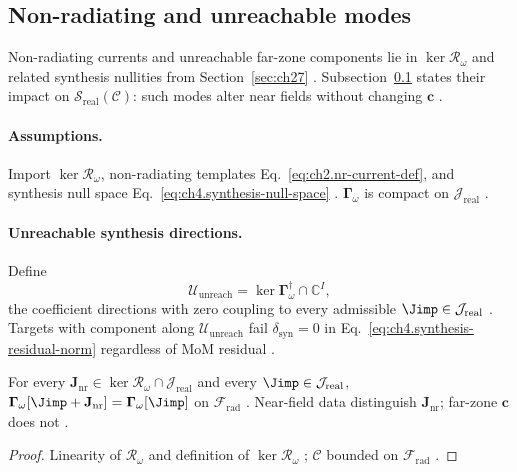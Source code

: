 \subsection{Non-radiating and unreachable modes}
\label{sec:ch471}

Non-radiating currents and unreachable far-zone components lie in \(\ker\mathcal{R}_\omega\) and related synthesis nullities
from Section~\ref{sec:ch27} \cite{stratton1941,harrington2001}. Subsection~\ref{sec:ch471} states their impact on
\(\mathcal{S}_{\mathrm{real}}(\mathcal{C})\): such modes alter near fields without changing \(\mathbf{c}\) \cite{devaney2004}.

\paragraph{Assumptions.}
Import \(\ker\mathcal{R}_\omega\), non-radiating templates Eq.~\eqref{eq:ch2.nr-current-def}, and synthesis null space
Eq.~\eqref{eq:ch4.synthesis-null-space} \cite{stratton1941,harrington2001}. \(\boldsymbol{\Gamma}_\omega\) is compact on
\(\mathcal{J}_{\mathrm{real}}\) \cite{harrington2001,devaney2004}.

\paragraph{Unreachable synthesis directions.}
Define
\begin{equation}
\label{eq:ch4.unreachable-modes}
\mathcal{U}_{\mathrm{unreach}}
=
\ker\boldsymbol{\Gamma}_\omega^{\dagger}
\cap
\mathbb{C}^{I},
\end{equation}
the coefficient directions with zero coupling to every admissible \(\Jimp\in\mathcal{J}_{\mathrm{real}}\)
\cite{stratton1941,harrington2001,devaney2004}. Targets with component along \(\mathcal{U}_{\mathrm{unreach}}\) fail
\(\delta_{\mathrm{syn}}=0\) in Eq.~\eqref{eq:ch4.synthesis-residual-norm} regardless of MoM residual \cite{harrington2001}.

\begin{theorem}
\label{thm:ch4.nr-lift-invisibility}
For every \(\mathbf{J}_{\mathrm{nr}}\in\ker\mathcal{R}_\omega\cap\mathcal{J}_{\mathrm{real}}\) and every
\(\Jimp\in\mathcal{J}_{\mathrm{real}}\),
\(\boldsymbol{\Gamma}_\omega[\Jimp+\mathbf{J}_{\mathrm{nr}}]=\boldsymbol{\Gamma}_\omega[\Jimp]\) on \(\mathcal{F}_{\mathrm{rad}}\)
\cite{stratton1941,harrington2001}. Near-field data distinguish \(\mathbf{J}_{\mathrm{nr}}\); far-zone \(\mathbf{c}\) does not
\cite{devaney2004}.
\end{theorem}
\begin{proof}
Linearity of \(\mathcal{R}_\omega\) and definition of \(\ker\mathcal{R}_\omega\) \cite{stratton1941}; \(\mathcal{C}\) bounded on
\(\mathcal{F}_{\mathrm{rad}}\) \cite{hansen1988,harrington2001}.
\end{proof}

